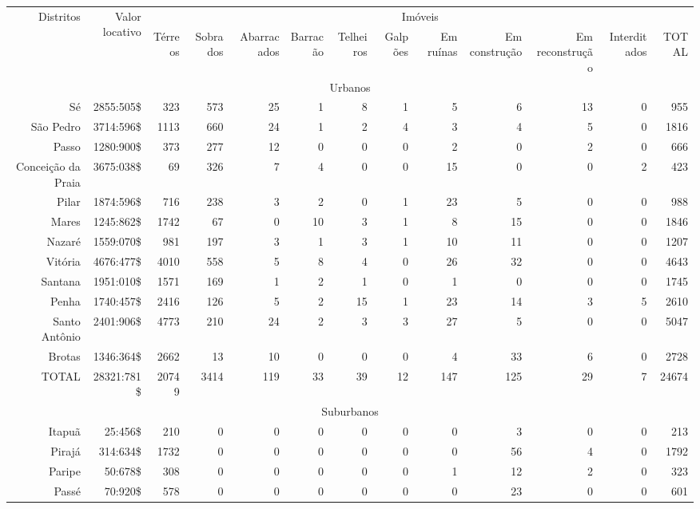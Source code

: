 \begin{sidewaystable*}[!htp]
\centering
{}
{
\begin{tiny}
\begin{tabular}{rrrrrrrrrrrrr}
\hline
\multirow{2}{*}{Distritos}&\multirow{2}{*}{Valor locativo}&\multicolumn{11}{c}{Imóveis}\\
\cline{3-13}
	&	&Térreos	&Sobrados	&Abarracados	&Barracão	&Telheiros	&Galpões	&Em ruínas	&Em construção	&Em reconstrução	&Interditados	&TOTAL\\
\hline 
\hline 
\multicolumn{13}{c}{Urbanos}\\
\hline 
Sé	&2855:505\$	&323	&573	&25	&1	&8	&1	&5	&6	&13	&0	&955\\
São Pedro	&3714:596\$	&1113	&660	&24	&1	&2	&4	&3	&4	&5	&0	&1816\\
Passo	&1280:900\$	&373	&277	&12	&0	&0	&0	&2	&0	&2	&0	&666\\
Conceição da Praia	&3675:038\$	&69	&326	&7	&4	&0	&0	&15	&0	&0	&2	&423\\
Pilar	&1874:596\$	&716	&238	&3	&2	&0	&1	&23	&5	&0	&0	&988\\
Mares	&1245:862\$	&1742	&67	&0	&10	&3	&1	&8	&15	&0	&0	&1846\\
Nazaré	&1559:070\$	&981	&197	&3	&1	&3	&1	&10	&11	&0	&0	&1207\\
Vitória	&4676:477\$	&4010	&558	&5	&8	&4	&0	&26	&32	&0	&0	&4643\\
Santana	&1951:010\$	&1571	&169	&1	&2	&1	&0	&1	&0	&0	&0	&1745\\
Penha	&1740:457\$	&2416	&126	&5	&2	&15	&1	&23	&14	&3	&5	&2610\\
Santo Antônio	&2401:906\$	&4773	&210	&24	&2	&3	&3	&27	&5	&0	&0	&5047\\
Brotas	&1346:364\$	&2662	&13	&10	&0	&0	&0	&4	&33	&6	&0	&2728\\
TOTAL 	&28321:781\$	&20749	&3414	&119	&33	&39	&12	&147	&125	&29	&7	&24674\\
\hline
\multicolumn{13}{c}{Suburbanos}\\
\hline
Itapuã	&25:456\$	&210	&0	&0	&0	&0	&0	&0	&3	&0	&0	&213\\
Pirajá	&314:634\$	&1732	&0	&0	&0	&0	&0	&0	&56	&4	&0	&1792\\
Paripe	&50:678\$	&308	&0	&0	&0	&0	&0	&1	&12	&2	&0	&323\\
Passé	&70:920\$	&578	&0	&0	&0	&0	&0	&0	&23	&0	&0	&601\\

\end{tabular}
\end{tiny}}
\end{sidewaystable*}

